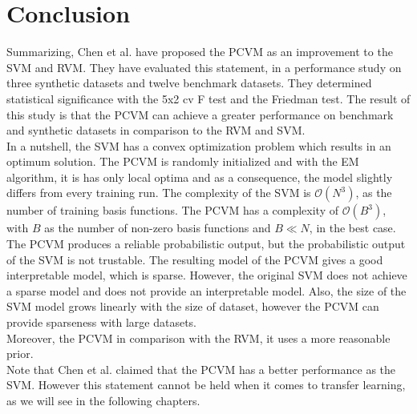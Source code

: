 \section{Conclusion}
Summarizing, Chen et al. have proposed the \acs{PCVM} as an improvement to the \acs{SVM} and \acs{RVM}.
They have evaluated this statement, in a performance study on three synthetic datasets and twelve benchmark datasets.
They determined statistical significance with the 5x2 cv F test and the Friedman test.
The result of this study is that the \acs{PCVM} can achieve a greater performance on benchmark and synthetic datasets in comparison to the \acs{RVM} and \acs{SVM}.\\
In a nutshell, the \acs{SVM} has a convex optimization problem which results in an optimum solution.
The \acs{PCVM} is randomly initialized and with the \acs{EM} algorithm, it is has only local optima and as a consequence, the model slightly differs from every training run.
The complexity of the \acs{SVM} is $\mathcal{O}(N^3)$, as the number of training basis functions.
The \acs{PCVM} has a complexity of $\mathcal{O}(B^3)$, with $B$ as the number of non-zero basis functions and $B \ll N$, in the best case.
The \acs{PCVM} produces a reliable probabilistic output, but the probabilistic output of the \acs{SVM} is not trustable. 
The resulting model of the \acs{PCVM} gives a good interpretable model, which is sparse. However, the original \acs{SVM} does not achieve a sparse model and does not provide an interpretable model.
Also, the size of the \acs{SVM} model grows linearly with the size of dataset, however the \acs{PCVM} can provide sparseness with large datasets.\\
Moreover, the \acs{PCVM} in comparison with the \acs{RVM}, it uses a more reasonable prior.\cite{Chen.2009}\\
Note that Chen et al. claimed that the \acs{PCVM} has a better performance as the \acs{SVM}.
However this statement cannot be held when it comes to transfer learning, as we will see in the following chapters.


